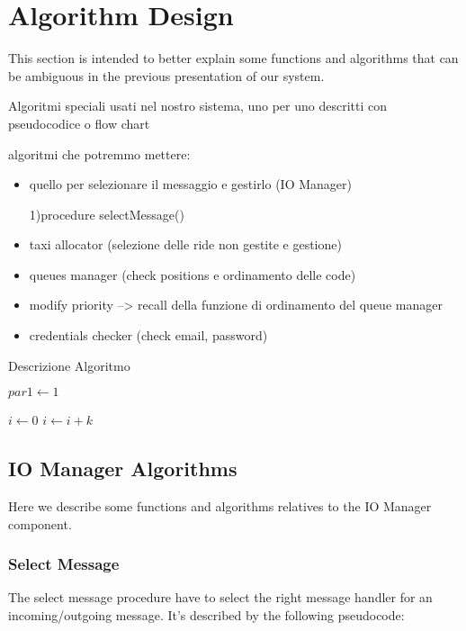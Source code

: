 \documentclass[../../dd.tex]{subfiles}
\begin{document}
	\chapter{Algorithm Design}
		This section is intended to better explain some functions and algorithms that can be ambiguous in the previous presentation of our system.


		Algoritmi speciali usati nel nostro sistema, uno per uno descritti con pseudocodice o flow chart

		algoritmi che potremmo mettere:
		\begin{itemize}
				\item quello per selezionare il messaggio e gestirlo (IO Manager)

					1)procedure selectMessage()
						
				\item taxi allocator (selezione delle ride non gestite e gestione)
				\item queues manager (check positions e ordinamento delle code)
				\item modify priority --> recall della funzione di ordinamento del queue manager
				\item credentials checker (check email, password)
		\end{itemize}

		\begin{algorithm}
			\caption{Descrizione Algoritmo}\label{alg:descrizioneAlgoritmo}
			\begin{algorithmic}[1]
				\State $par1\gets 1$

				    \State $i\gets 0$
				\Else
				        \State $i\gets i+k$
				    \EndIf
				\EndIf
			\EndProcedure
			\end{algorithmic}
		\end{algorithm}

		\section{IO Manager Algorithms}
			Here we describe some functions and algorithms relatives to the IO Manager component.
			\subsection{Select Message}
				The select message procedure have to select the right message handler for an incoming/outgoing message.
				It's described by the following pseudocode:
\end{document}

